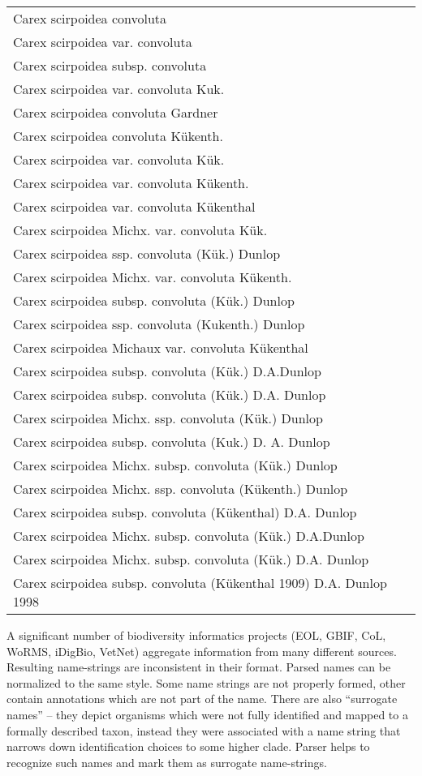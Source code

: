 \documentclass{bmcart}
\begin{document}
\begin{tabular}{| l | r |}
\hline
Carex scirpoidea convoluta & \\
Carex scirpoidea var. convoluta & \\
Carex scirpoidea subsp. convoluta & \\
Carex scirpoidea var. convoluta Kuk. & \\
Carex scirpoidea convoluta Gardner & \\
Carex scirpoidea convoluta Kükenth. & \\
Carex scirpoidea var. convoluta Kük. & \\
Carex scirpoidea var. convoluta Kükenth. & \\
Carex scirpoidea var. convoluta Kükenthal & \\
Carex scirpoidea Michx. var. convoluta Kük. & \\
Carex scirpoidea ssp. convoluta (Kük.) Dunlop & \\
Carex scirpoidea Michx. var. convoluta Kükenth. & \\
Carex scirpoidea subsp. convoluta (Kük.) Dunlop & \\
Carex scirpoidea ssp. convoluta (Kukenth.) Dunlop & \\
Carex scirpoidea Michaux var. convoluta Kükenthal & \\
Carex scirpoidea subsp. convoluta (Kük.) D.A.Dunlop & \\
Carex scirpoidea subsp. convoluta (Kük.) D.A. Dunlop & \\
Carex scirpoidea Michx. ssp. convoluta (Kük.) Dunlop & \\
Carex scirpoidea subsp. convoluta (Kuk.) D. A. Dunlop & \\
Carex scirpoidea Michx. subsp. convoluta (Kük.) Dunlop & \\
Carex scirpoidea Michx. ssp. convoluta (Kükenth.) Dunlop & \\
Carex scirpoidea subsp. convoluta (Kükenthal) D.A. Dunlop & \\
Carex scirpoidea Michx. subsp. convoluta (Kük.) D.A.Dunlop & \\
Carex scirpoidea Michx. subsp. convoluta (Kük.) D.A. Dunlop & \\
Carex scirpoidea subsp. convoluta (Kükenthal 1909) D.A. Dunlop 1998
&
\\
\hline
\end{tabular}

A significant number of biodiversity informatics projects (EOL, GBIF, CoL,
WoRMS, iDigBio, VetNet) aggregate information from many different sources.
Resulting name-strings are inconsistent in their format. Parsed names can be
normalized to the same style. Some name strings are not properly formed, other
contain annotations which are not part of the name. There are also “surrogate
names” -- they depict organisms which were not fully identified and mapped to a
formally described taxon, instead they were associated with a name string that
narrows down identification choices to some higher clade. Parser helps to
recognize such names and mark them as surrogate name-strings.  
\end{document}
